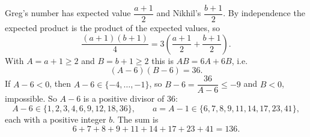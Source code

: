 Greg's number has expected value $\dfrac{a+1}{2}$ and Nikhil's $\dfrac{b+1}{2}$. By independence the expected product is the product of the expected values, so
\[\dfrac{(a+1)(b+1)}{4}=3\left(\dfrac{a+1}{2}+\dfrac{b+1}{2}\right).\]
With $A=a+1\ge2$ and $B=b+1\ge2$ this is $AB=6A+6B$, i.e.
\[(A-6)(B-6)=36.\]
If $A-6<0$, then $A-6\in\{-4,\dots,-1\}$, so $B-6=\dfrac{36}{A-6}\le-9$ and $B<0$, impossible. So $A-6$ is a positive divisor of $36$:
\[A-6\in\{1,2,3,4,6,9,12,18,36\},\qquad a=A-1\in\{6,7,8,9,11,14,17,23,41\},\]
each with a positive integer $b$. The sum is
\[6+7+8+9+11+14+17+23+41=\boxed{136}.\]
